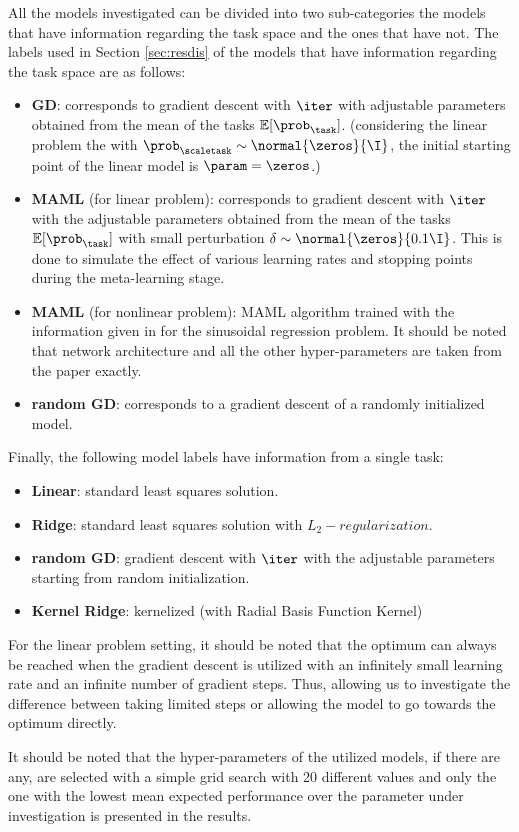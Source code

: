 All the models investigated can be divided into two sub-categories the models that have information regarding the task space and the ones that have not. The labels  used in Section \ref{sec:resdis} of the models that have information regarding the task space are as follows:
\begin{itemize}
  \item \textbf{GD}: corresponds to gradient descent with $\iter$ with adjustable parameters obtained from the mean of the tasks $\mathbb{E}[\prob_{\task}]$. (\eg considering the linear problem the with $\prob_{\scaletask}\sim\normal{\zeros}{\I}$, the initial starting point of the linear model is $\param=\zeros$.)
  \item \textbf{MAML} (for linear problem): corresponds to gradient descent with $\iter$ with the adjustable parameters obtained from the mean of the tasks $\mathbb{E}[\prob_{\task}]$ with small perturbation $\delta\sim\normal{\zeros}{0.1\I}$. This is done to simulate the effect of various learning rates and stopping points during the meta-learning stage.
  \item \textbf{MAML} (for nonlinear problem): MAML algorithm trained with the information given in \cite{finn2017} for the sinusoidal regression problem. It should be noted that network architecture and all the other hyper-parameters are taken from the paper exactly.
  \item \textbf{random GD}: corresponds to a gradient descent of a randomly initialized model.
\end{itemize} 

Finally, the following model labels have information from a single task:
\begin{itemize}
  \item \textbf{Linear}: standard least squares solution.
  \item \textbf{Ridge}: standard least squares solution with $L_2-regularization$.
  \item \textbf{random GD}: gradient descent with $\iter$ with the adjustable parameters starting from random initialization.
  \item \textbf{Kernel Ridge}: kernelized (with Radial Basis Function Kernel) 
\end{itemize}

For the linear problem setting, it should be noted that the optimum can always be reached when the gradient descent is utilized with an infinitely small learning rate and an infinite number of gradient steps. Thus, allowing us to investigate the difference between taking limited steps or allowing the model to go towards the optimum directly.

It should be noted that the hyper-parameters of the utilized models, if there are any, are selected with a simple grid search with 20 different values and only the one with the lowest mean expected performance over the parameter under investigation is presented in the results. 



